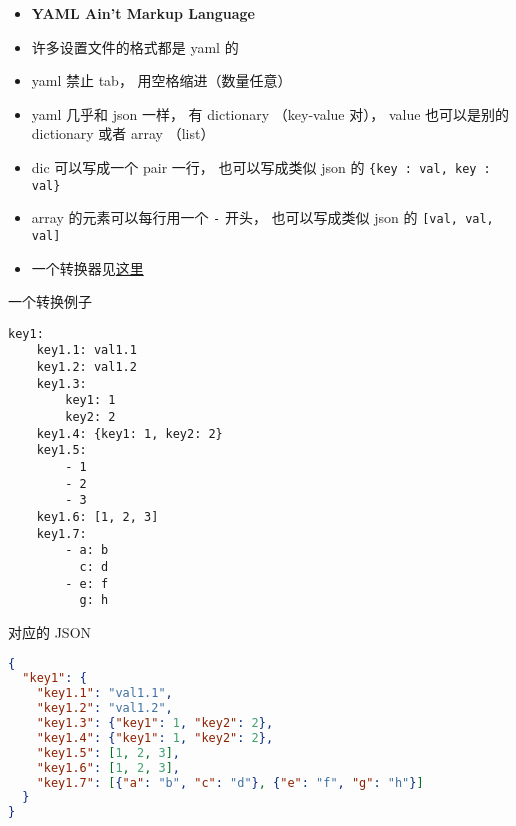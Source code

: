 
\begin{issues}
\issueDraft
\end{issues}


\begin{itemize}
\item \textbf{YAML Ain't Markup Language}
\item 许多设置文件的格式都是 yaml 的
\item yaml 禁止 tab， 用空格缩进（数量任意）
\item yaml 几乎和 json 一样， 有 dictionary （key-value 对）， value 也可以是别的 dictionary 或者 array （list）
\item dic 可以写成一个 pair 一行， 也可以写成类似 json 的 \verb|{key : val, key : val}|
\item array 的元素可以每行用一个 \verb|-| 开头， 也可以写成类似 json 的 \verb|[val, val, val]|
\item 一个转换器见\href{https://onlineyamltools.com/convert-yaml-to-json}{这里}
\end{itemize}

一个转换例子
\begin{lstlisting}[language=none]
key1:
    key1.1: val1.1
    key1.2: val1.2
    key1.3:
        key1: 1
        key2: 2
    key1.4: {key1: 1, key2: 2}
    key1.5:
        - 1
        - 2
        - 3
    key1.6: [1, 2, 3]
    key1.7:
        - a: b
          c: d
        - e: f
          g: h
\end{lstlisting}
对应的 JSON
\begin{lstlisting}[language=json]
{
  "key1": {
    "key1.1": "val1.1",
    "key1.2": "val1.2",
    "key1.3": {"key1": 1, "key2": 2},
    "key1.4": {"key1": 1, "key2": 2},
    "key1.5": [1, 2, 3],
    "key1.6": [1, 2, 3],
    "key1.7": [{"a": "b", "c": "d"}, {"e": "f", "g": "h"}]
  }
}
\end{lstlisting}
